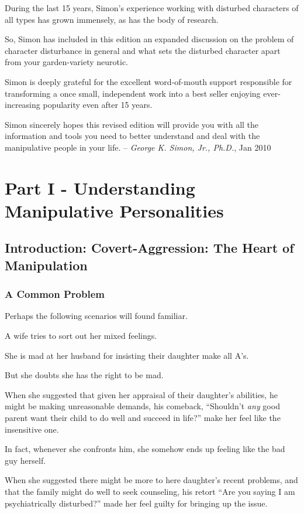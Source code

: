 \documentclass[oneside]{book}
\numberwithin{equation}{section}
\begin{document}
During the last 15 years, Simon's experience working with disturbed characters of all types has grown immensely, as has the body of research.

So, Simon has included in this edition an expanded discussion on the problem of character disturbance in general and what sets the disturbed character apart from your garden-variety neurotic.

%
Simon is deeply grateful for the excellent word-of-mouth support responsible for transforming a once small, independent work into a best seller enjoying ever-increasing popularity even after 15 years.

Simon sincerely hopes this revised edition will provide you with all the information and tools you need to better understand and deal with the manipulative people in your life. -- \textit{George K. Simon, Jr., Ph.D.}, Jan 2010

\chapter*{Part I - Understanding Manipulative Personalities}

\section*{Introduction: Covert-Aggression: The Heart of Manipulation}

\subsection*{A Common Problem}
Perhaps the following scenarios will found familiar.

A wife tries to sort out her mixed feelings.

She is mad at her husband for insisting their daughter make all A's.

But she doubts she has the right to be mad.

When she suggested that given her appraisal of their daughter's abilities, he might be making unreasonable demands, his comeback, ``Shouldn't \textit{any} good parent want their child to do well and succeed in life?'' make her feel like the insensitive one.

In fact, whenever she confronts him, she somehow ends up feeling like the bad guy herself.

When she suggested there might be more to here daughter's recent problems, and that the family might do well to seek counseling, his retort ``Are you saying I am psychiatrically disturbed?'' made her feel guilty for bringing up the issue.
\end{document}
